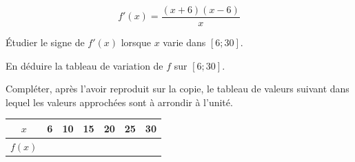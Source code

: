 \documentclass[a4paper,12pt]{scrartcl}
\begin{document}
\begin{equation*}
f'(x) = \dfrac{(x+6)(x-6)}{x}
\end{equation*}

 
 \subquestion{}
 Étudier le signe de $f'(x)$ lorsque $x$ varie dans $[6;30]$.

 
 \subquestion{}
 En déduire la tableau de variation de $f$ sur $[6;30]$.

 
 
 \subquestion{}
Compléter, après l'avoir reproduit sur la copie, le tableau de valeurs suivant dans lequel les valeurs approchées sont à arrondir à l'unité.

\begin{center}
\begin{tabular}{|c|c|c|c|c|c|c|}
\hline
$x$    & 6 & 10 & 15 & 20 & 25 & 30 \\ \hline
$f(x)$ & \hspace{15mm}  &  \hspace{15mm}  &  \hspace{15mm}  &  \hspace{15mm}  &  \hspace{15mm}  &  \hspace{15mm}  \\ \hline
\end{tabular}
\end{center}

\end{document}
